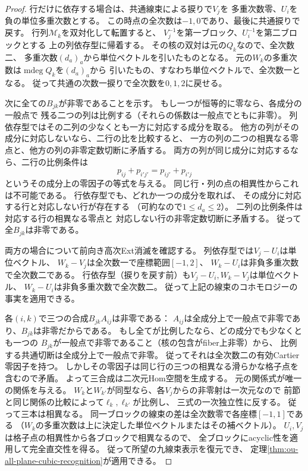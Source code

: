 \begin{proof}
行だけに依存する場合は、共通線束による捩りで$V_j$を
多重次数零、$U_i$を負の単位多重次数とする。
この時点の全次数は$-1,0$であり、最後に共通捩りで戻す。
行列$\mathscr M_k$を双対化して転置すると、
$V_j^{-1}$を第一ブロック、$U_i^{-1}$を第二ブロックとする
上の列依存型に帰着する。
その核の双対は元の$Q_k$なので、全次数二、
多重次数$(d_a)_a$から単位ベクトルを引いたものとなる。
元の$W_k$の多重次数は$\operatorname{mdeg}Q_k$を$(d_a)_a$から
引いたもの、すなわち単位ベクトルで、全次数一となる。
従って共通の次数一捩りで全次数を$0,1,2$に戻せる。

次に全ての$B_{jk}$が非零であることを示す。
もし一つが恒等的に零なら、各成分の一般点で
残る二つの列は比例する（それらの係数は一般点でともに非零）。
列依存型ではその二列の少なくとも一方に対応する成分を取る。
他方の列がその成分に対応しないなら、二行の比を比較すると、
一方の列の二つの相異なる零点と、他方の列の非零定数切断に矛盾する。
両方の列が同じ成分に対応するなら、二行の比例条件は
\[
 p_{ij}+p_{i'j'}=p_{ij'}+p_{i'j}
\]
というその成分上の零因子の等式を与える。
同じ行・列の点の相異性からこれは不可能である。
行依存型でも、どれか一つの成分を取れば、
その成分に対応する行と対応しない行が存在する
（可約なので$1\leq d_a\leq2$）。
二列の比例条件は対応する行の相異なる零点と
対応しない行の非零定数切断に矛盾する。
従って全$B_{jk}$は非零である。

両方の場合について前向き高次Ext消滅を確認する。
列依存型では$V_j-U_i$は単位ベクトル、
$W_k-V_j$は全次数一で座標範囲$[-1,2]$、
$W_k-U_i$は非負多重次数で全次数二である。
行依存型（捩りを戻す前）も$V_j-U_i,W_k-V_j$は単位ベクトル、
$W_k-U_i$は非負多重次数で全次数二。
従って上記の線束のコホモロジーの事実を適用できる。

各$(i,k)$で三つの合成$B_{jk}A_{ij}$は非零である：
$A_{ij}$は全成分上で一般点で非零であり、$B_{jk}$は非零だからである。
もし全てが比例したなら、どの成分でも少なくとも一つの
$B_{jk}$が一般点で非零であること（核の包含がfiber上非零）から、
比例する共通切断は全成分上で一般点で非零。
従ってそれは全次数二の有効Cartier零因子を持つ。
しかしその零因子は同じ行の三つの相異なる滑らかな格子点を含むので矛盾。
よって三合成は二次元Hom空間を生成する。
元の関係式が唯一の関係を与える。
$W_k$と$W_{k'}$が同型なら、各$V_j$からの非零射は一次元なので
前節と同じ関係の比較によって$\ell_k,\ell_{k'}$が比例し、
三式の一次独立性に反する。
従って三本は相異なる。
同一ブロックの線束の差は全次数零で各座標$[-1,1]$である
（$W_k$の多重次数は上に決定した単位ベクトルまたはその補ベクトル）。
$U_i,V_j$は格子点の相異性から各ブロックで相異なるので、
全ブロックにacyclic性を適用して完全直交性を得る。
従って所望の九線束表示を復元でき、
定理\ref{thm:ou-all-plane-cubic-recognition}が適用できる。
\end{proof}

